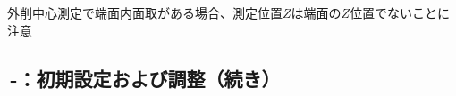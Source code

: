 \begin{marker}
外削中心測定\MXIface で端面内面取がある場合、測定位置$Z$は端面の$Z$位置でないことに注意
\end{marker}


\clearpage
\subsection{\,-：初期設定および調整（続き）}

